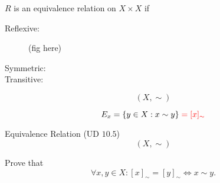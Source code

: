 \begin{frame}{}
  \begin{definition}
    $R$ is an equivalence relation on $X \times X$ if
    \begin{description}
      \item[Reflexive:] 
	(fig here)
      \item[Symmetric:] 
      \item[Transitive:] 
    \end{description}
  \end{definition}

  \pause
  \vspace{0.50cm}
  \begin{definition}
    \[
      (X, \sim)
    \]

    \[
      E_{x} = \{y \in X: x \sim y\} \; \textcolor{red}{= [x]_{\sim}}
    \]
  \end{definition}
\end{frame}

\begin{frame}{}
  \begin{exampleblock}{Equivalence Relation (UD $10.5$)}
    \[
      (X, \sim)
    \]

    Prove that 
    \[
      \forall x, y \in X: [x]_{\sim} = [y]_{\sim} \iff x \sim y.
    \]
  \end{exampleblock}
\end{frame}

